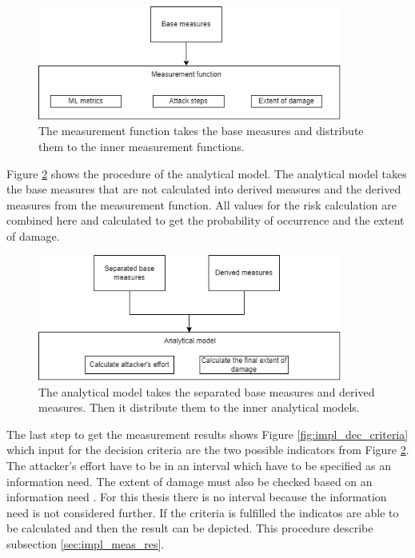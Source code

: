 \begin{figure}[ht!]
  \centering
  \includegraphics[width=10cm]{pictures/impl_meas_func.png}
  \caption{The measurement function takes the base measures and distribute them to the inner measurement functions.}
  \label{fig:impl_meas_func}
\end{figure}

Figure \ref{fig:impl_ana_mod} shows the procedure of the analytical model. The analytical model takes the base measures that are not calculated into derived measures and the derived measures from the measurement function. All values for the risk calculation are combined here and calculated to get the probability of occurrence and the extent of damage.

\begin{figure}[ht!]
  \centering
  \includegraphics[width=10cm]{pictures/impl_ana_mod.png}
  \caption{The analytical model takes the separated base measures and derived measures. Then it distribute them to the inner analytical models.}
  \label{fig:impl_ana_mod}
\end{figure}

The last step to get the measurement results shows Figure \ref{fig:impl_dec_criteria} which input for the decision criteria are the two possible indicators from Figure \ref{fig:impl_ana_mod}. The attacker's effort have to be in an interval which have to be specified as an information need. The extent of damage must also be checked based on an information need \cite{ISO_27004_2009}. For this thesis there is no interval because the information need is not considered further. If the criteria is fulfilled the indicatos are able to be calculated and then the result can be depicted. This procedure describe subsection \ref{sec:impl_meas_res}.

